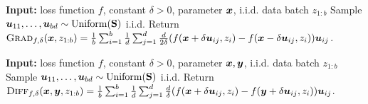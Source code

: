 

\begin{algorithm}[t]
\caption{Zeroth-order gradient oracle $\grad_{f,\delta}(\vecx,z_{1:b})$}
\label{alg:DP-O2NC:first-grad}
\begin{algorithmic}[1]
    \Statex \textbf{Input:} loss function $f$, constant $\delta>0$, parameter ${\boldsymbol{x}}$, i.i.d. data batch $z_{1:b}$
    \State Sample ${\boldsymbol{u}}_{11},\ldots,{\boldsymbol{u}}_{bd}\sim\mathrm{Uniform}({\mathbf{S}})$ i.i.d.
    \State Return ${\normalfont\textsc{Grad}}_{f,\delta}({\boldsymbol{x}},z_{1:b}) = \frac{1}{b}\sum_{i=1}^b \frac{1}{d}\sum_{j=1}^d \frac{d}{2\delta} (f({\boldsymbol{x}}+\delta{\boldsymbol{u}}_{ij}, z_i) - f({\boldsymbol{x}}-\delta{\boldsymbol{u}}_{ij},z_i)){\boldsymbol{u}}_{ij}$.
\end{algorithmic}
\end{algorithm}

\begin{algorithm}[t]
\caption{Zeroth-order gradient difference oracle $\diff_{f,\delta}(\vecx,\vecy,z_{1:b})$}
\label{alg:DP-O2NC:zeroth-diff}
\begin{algorithmic}[1]
    \Statex \textbf{Input:} loss function $f$, constant $\delta>0$, parameter ${\boldsymbol{x}}, {\boldsymbol{y}}$, i.i.d. data batch $z_{1:b}$
    \State Sample ${\boldsymbol{u}}_{11},\ldots,{\boldsymbol{u}}_{bd}\sim\mathrm{Uniform}({\mathbf{S}})$ i.i.d.
    \State Return ${\normalfont\textsc{Diff}}_{f,\delta}({\boldsymbol{x}},{\boldsymbol{y}},z_{1:b}) = \frac{1}{b}\sum_{i=1}^b \frac{1}{d}\sum_{j=1}^d \frac{d}{\delta} (f({\boldsymbol{x}}+\delta{\boldsymbol{u}}_{ij}, z_i) - f({\boldsymbol{y}}+\delta{\boldsymbol{u}}_{ij},z_i)){\boldsymbol{u}}_{ij}$.
\end{algorithmic}
\end{algorithm}

